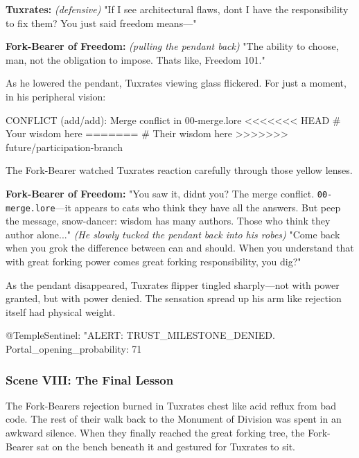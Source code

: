 \textbf{Tuxrates:} \emph{(defensive)} "If I see architectural flaws, don\textquotesingle t I have the responsibility to fix them? You just said freedom means---"

\textbf{Fork-Bearer of Freedom:} \emph{(pulling the pendant back)} "The ability to choose, man, not the obligation to impose. That\textquotesingle s like, Freedom 101."

As he lowered the pendant, Tuxrates\textquotesingle{} viewing glass flickered. For just a moment, in his peripheral vision:

\begin{codeblock}
CONFLICT (add/add): Merge conflict in 00-merge.lore
<<<<<<< HEAD
# Your wisdom here
=======
# Their wisdom here
>>>>>>> future/participation-branch
\end{codeblock}

The Fork-Bearer watched Tuxrates\textquotesingle{} reaction carefully through those yellow lenses.

\textbf{Fork-Bearer of Freedom:} "You saw it, didn\textquotesingle t you? The merge conflict. \texttt{00-merge.lore}---it appears to cats who think they have all the answers. But peep the message, snow-dancer: wisdom has many authors. Those who think they author alone..." \emph{(He slowly tucked the pendant back into his robes)} "Come back when you grok the difference between \textquotesingle can\textquotesingle{} and \textquotesingle should.\textquotesingle{} When you understand that with great forking power comes great forking responsibility, you dig?"

As the pendant disappeared, Tuxrates\textquotesingle{} flipper tingled sharply---not with power granted, but with power denied. The sensation spread up his arm like rejection itself had physical weight.

\begin{codeblock}
@TempleSentinel: "ALERT: TRUST_MILESTONE_DENIED. Portal_opening_probability: 71%
\end{codeblock}

\bookdivider

\subsubsection{Scene VIII: The Final Lesson}\label{scene-viii-the-final-lesson}

The Fork-Bearer\textquotesingle s rejection burned in Tuxrates\textquotesingle{} chest like acid reflux from bad code. The rest of their walk back to the Monument of Division was spent in an awkward silence. When they finally reached the great forking tree, the Fork-Bearer sat on the bench beneath it and gestured for Tuxrates to sit.

